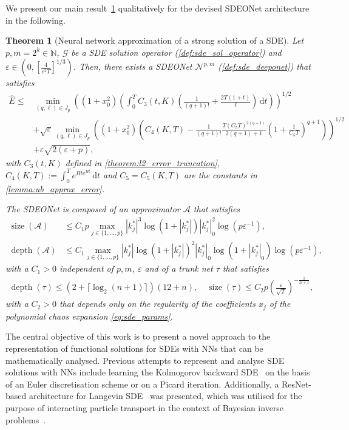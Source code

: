 \documentclass[12pt]{article}
\newtheorem{theorem}{Theorem}[section]
\theoremstyle{remark}
\theoremstyle{plain}
\numberwithin{equation}{section}
\newcommand{\dd}{\ensuremath{\,\mathrm d}}
\newcommand{\N}{\mathbb{N}}
\DeclareMathOperator{\Size}{size}
\DeclareMathOperator{\Depth}{depth}
\begin{document}
We present our main result~\cref{theorem:main_result} qualitatively for the devised SDEONet architecture in the following.

\begin{theorem}[Neural network approximation of a strong solution of a SDE]\label{theorem:main_result}
    Let $p,m=2^k \in \N$, $\mathcal G$ be a SDE solution operator (\cref{def:sde_sol_operator}) and $\varepsilon \in \left(0, \left[\frac{4}{e^2 T}\right]^{1/3}\right)$.
    Then, there exists a SDEONet $\mathcal N^{p,m}$ (\cref{def:sde_deeponet}) that satisfies
    \begin{align*}
        \hat E \leq & \min_{(q,\ell) \in J_p}\left( (1+x_0^2)\left(\int_0^T C_3(t, K)\left(\frac{1}{(q+1)!} + \frac{2T(1+t)}{\ell}\right) \dd t\right)\right)^{1/2}\\
        & + \sqrt{\varepsilon} \min_{(q,\ell) \in J_p} \left((1+x_0^2)\left(C_4(K,T) - \frac{1}{(q+1)!}\frac{T(C_5 T)^{2(q+1)}}{2(q+1)+1}\left(1+\frac{1}{C_5 T}\right)^{q+1}\right)\right)^{1/2}\\
        & + \varepsilon\sqrt{2(\varepsilon + p)},
    \end{align*}
    with $C_3(t,K)$ defined in \cref{theorem:l2_error_truncation}, $C_4(K,T):=\int_0^T e^{Bte^{Bt}} \dd t$ and $C_5=C_5(K,T)$ are the constants in \cref{lemma:ub_approx_error}.

    The SDEONet is composed of an \emph{approximator} $\mathcal A$ that satisfies
    \begin{align*}
        \Size(\mathcal A) &\leq C_1 p \max_{j \in \{1,\dots,p\}}|k_j^*|^3 \log(1+|k_j^*|)|k_j^*|_0^2 \log(p\varepsilon^{-1}),\\
        \Depth(\mathcal A) &\leq C_1 \max_{j \in \{1,\dots,p\}} |k_j^*|\log(1+|k_j^*|)^2|k_j^*|_0\log(1+|k_j^*|_0)\log(p\varepsilon^{-1}),
    \end{align*}
    with a $C_1 > 0$ independent of $p, m$, $\varepsilon$ and of a \emph{trunk net} $\tau$ that satisfies
    \begin{align*}
        \Depth(\tau) \leq (2+\lceil \log_2(n+1)\rceil)(12+n),\quad
        \Size(\tau) \leq C_2 p\left(\frac{\varepsilon}{\sqrt T}\right)^{-\frac{1}{n+1}},
    \end{align*}
    with a $C_2 > 0$ that depends only on the regularity of the coefficients $x_j$ of the polynomial chaos expansion \cref{eq:sde_params}.
\end{theorem}

The central objective of this work is to present a novel approach to the representation of functional solutions for SDEs with NNs that can be mathematically analysed. Previous attempts to represent and analyse SDE solutions with NNs include learning the Kolmogorov backward SDE~\cite{beck2021solving} on the basis of an Euler discretisation scheme or on a Picard iteration.
Additionally, a ResNet-based architecture for Langevin SDE~\cite{eigel2023approximating} was presented, which was utilised for the purpose of interacting particle transport in the context of Bayesian inverse problems~\cite{garbuno2020affine,eigel2022less}.
\end{document}
